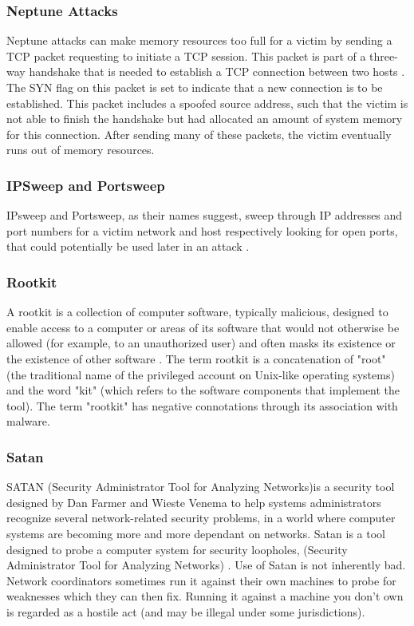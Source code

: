 \documentclass[12pt]{article}
\theoremstyle{definition}
\begin{document}
			\subsubsection{Neptune Attacks}
			
			Neptune attacks can make memory resources too
			full for a victim by sending a TCP packet requesting  to  initiate a TCP session. This  packet is part of a three-way handshake that is needed to establish a TCP connection between  two  hosts \cite{Wang2010}. The SYN flag on this packet is set  to  indicate that a new connection is  to  be  established. This packet includes  a spoofed  source  address, such that the victim is not able to finish the handshake but  had allocated  an  amount of system memory for this connection. After sending many of these packets, the victim eventually runs out of memory resources.
			
			\subsubsection{IPSweep and Portsweep}
			IPsweep  and  Portsweep,  as  their  names  suggest, sweep through IP addresses and port numbers for a  victim  network  and  host  respectively looking for open ports, that could  potentially be used later in an attack \cite{Wang2010}.
			
			\subsubsection{Rootkit}
			A rootkit is a collection of computer software, typically malicious, designed to enable access to a computer or areas of its software that would not otherwise be allowed (for example, to an unauthorized user) and often masks its existence or the existence of other software \cite{Wang2010}. The term rootkit is a concatenation of "root" (the traditional name of the privileged account on Unix-like operating systems) and the word "kit" (which refers to the software components that implement the tool). The term "rootkit" has negative connotations through its association with malware.
			
			\subsubsection{Satan}
			SATAN (Security Administrator Tool for Analyzing Networks)is a security tool designed by Dan Farmer and Wieste Venema to help systems administrators recognize several network-related security problems, in a world where computer systems are becoming more and more dependant on networks. Satan is a tool designed to probe a computer system for security loopholes, (Security Administrator Tool for Analyzing Networks) \cite{Wang2010}. Use of Satan is not inherently bad. Network coordinators sometimes run it against their own machines to probe for weaknesses which they can then fix. Running it against a machine you don't own is regarded as a hostile act (and may be illegal under some jurisdictions).
			
\end{document}
